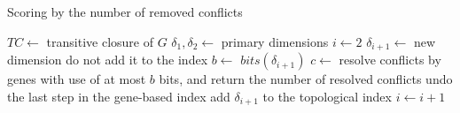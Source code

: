 %
%

\begin{algorithm}
  \caption{Scoring by the number of removed conflicts}
  \label{alg:scoringByNumOfRemovedConflicts}
  \begin{algorithmic}
    \State $TC \gets$ transitive closure of $G$
    \State $\delta_1, \delta_2 \gets$ primary dimensions
    \State $i \gets 2$
      \State $\delta_{i+1} \gets$ new dimension \Comment do not add it to the index
      \State $b \gets$ $bits(\delta_{i+1})$
      \State $c \gets$ resolve conflicts by genes with use of at most $b$ bits, and return the number of resolved
      conflicts
        \State undo the last step in the gene-based index
        \State add $\delta_{i+1}$ to the topological index
        \State $i \gets i+1$
      \EndIf
    \EndWhile   
  \end{algorithmic}
\end{algorithm}

